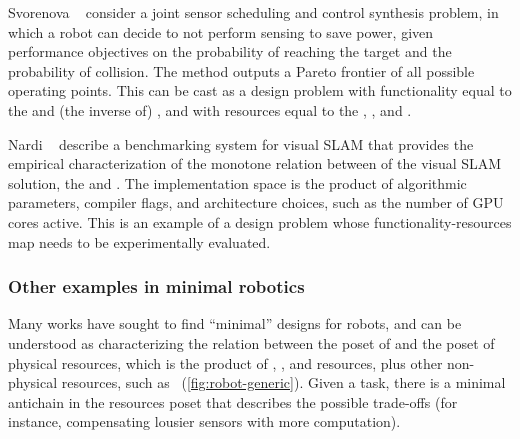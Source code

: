 \begin{figure*}[h!]
	\centering
	\caption{}
\end{figure*}

\begin{example}
	Svorenova\,\,\etal~\cite{svorenova16resource} consider a joint sensor scheduling and control synthesis problem, in which a robot can decide to not perform sensing to save power, given performance objectives on the probability of reaching the target and the probability of collision.
	The method outputs a Pareto frontier of all possible operating points.
	This can be cast as a design problem with functionality equal to the  and (the inverse of) , and with resources equal to the
	, , and .
\end{example}

\begin{figure}[h]
	\centering
	\caption{}
	\label{fig:progressive-1-1}
\end{figure}

\begin{example}
	Nardi\,\,\etal~\cite{zia16comparative} describe a benchmarking system for visual SLAM that provides the empirical characterization of the monotone relation between  of the visual SLAM solution, the  and .
	The implementation space is the product of algorithmic parameters, compiler flags, and architecture choices, such as the number of GPU cores active.
	This is an example of a design problem whose functionality-resources map needs to be experimentally evaluated.
\end{example}

\begin{figure}[h]
	\centering
	\caption{}
	\label{fig:dp_zia}
\end{figure}

\subsubsection{Other examples in minimal robotics}

Many works have sought to find ``minimal'' designs for robots, and can be understood as characterizing the relation between the poset of  and the poset of physical resources, which is the product of , , and  resources, plus other non-physical resources, such as ~(\cref{fig:robot-generic}).
Given a task, there is a minimal antichain in the resources poset that describes the possible trade-offs (for instance, compensating lousier sensors with more computation).

